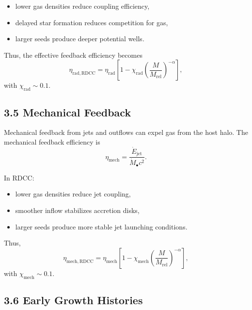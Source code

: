 \documentclass[11pt,a4paper]{article}
\begin{document}
\begin{itemize}
    \item lower gas densities reduce coupling efficiency,
    \item delayed star formation reduces competition for gas,
    \item larger seeds produce deeper potential wells.
\end{itemize}

Thus, the effective feedback efficiency becomes
\begin{equation}
    \eta_{\mathrm{rad,RDCC}}
    = \eta_{\mathrm{rad}}
      \left[
        1 - \chi_{\mathrm{rad}}
        \left(\frac{M}{M_{\mathrm{rel}}}\right)^{-\alpha}
      \right],
\end{equation}
with $\chi_{\mathrm{rad}} \sim 0.1$.

\subsection*{3.5 Mechanical Feedback}

Mechanical feedback from jets and outflows can expel gas from the host halo. The mechanical 
feedback efficiency is
\begin{equation}
    \eta_{\mathrm{mech}}
    = \frac{\dot{E}_{\mathrm{jet}}}{\dot{M}_{\bullet} c^{2}}.
\end{equation}

In RDCC:

\begin{itemize}
    \item lower gas densities reduce jet coupling,
    \item smoother inflow stabilizes accretion disks,
    \item larger seeds produce more stable jet launching conditions.
\end{itemize}

Thus,
\begin{equation}
    \eta_{\mathrm{mech,RDCC}}
    = \eta_{\mathrm{mech}}
      \left[
        1 - \chi_{\mathrm{mech}}
        \left(\frac{M}{M_{\mathrm{rel}}}\right)^{-\alpha}
      \right],
\end{equation}
with $\chi_{\mathrm{mech}} \sim 0.1$.

\subsection*{3.6 Early Growth Histories}
\end{document}
